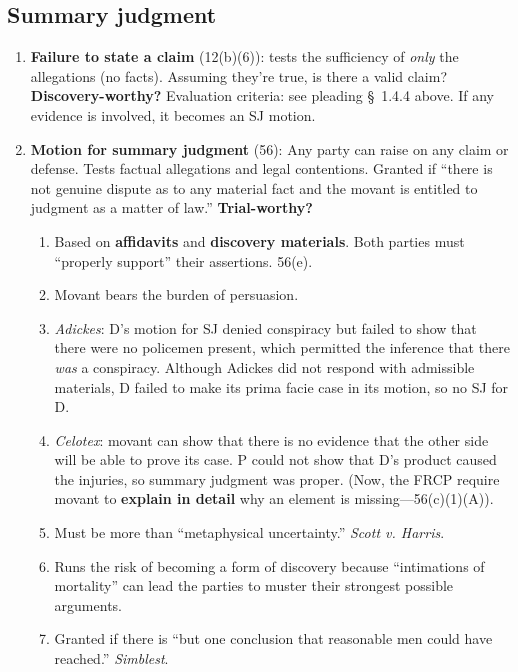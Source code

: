 \subsection{Summary judgment}

\begin{enumerate}
    \item \textbf{Failure to state a claim} (12(b)(6)): tests the sufficiency 
    of \emph{only} the allegations (no facts). Assuming they're true, is there 
    a valid claim? \textbf{Discovery-worthy?} Evaluation criteria: see 
    pleading \S\ 1.4.4 above. If any evidence is involved, it becomes an SJ 
    motion.
    \item \textbf{Motion for summary judgment} (56): Any party can raise on 
    any claim or defense. Tests factual allegations and legal contentions.  
    Granted if ``there is not genuine dispute as to any material fact and the 
    movant is entitled to judgment as a matter of law.'' 
    \textbf{Trial-worthy?}
    \begin{enumerate}
        \item Based on \textbf{affidavits} and \textbf{discovery materials}.  
        Both parties must ``properly support'' their assertions. 56(e).
        \item Movant bears the burden of persuasion.
        \item \emph{Adickes}: D's motion for SJ denied conspiracy but failed 
        to show that there were no policemen present, which permitted the 
        inference that there \emph{was} a conspiracy. Although Adickes did not 
        respond with admissible materials, D failed to make its prima facie 
        case in its motion, so no SJ for D.
        \item \emph{Celotex}: movant can show that there is no evidence that 
        the other side will be able to prove its case. P could not show that 
        D's product caused the injuries, so summary judgment was proper. (Now, 
        the FRCP require movant to \textbf{explain in detail} why an element 
        is missing---56(c)(1)(A)).
        \item Must be more than ``metaphysical uncertainty.'' \emph{Scott v.  
        Harris}.
        \item Runs the risk of becoming a form of discovery because 
        ``intimations of mortality'' can lead the parties to muster their 
        strongest possible arguments.  \item Granted if there is ``but one 
        conclusion that reasonable men could have reached.'' \emph{Simblest}.
    \end{enumerate}
\end{enumerate}

